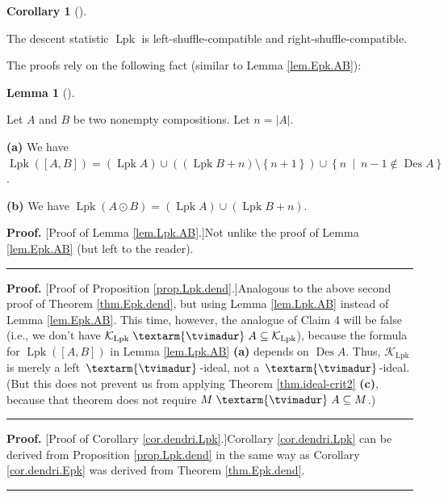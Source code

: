 \documentclass[numbers=enddot,12pt,final,onecolumn,notitlepage]{scrartcl}%
\theoremstyle{definition}
\newtheorem{lem}[theo]{Lemma}
\newenvironment{lemma}[1][]
{\begin{lem}[#1]\begin{leftbar}}
{\end{leftbar}\end{lem}}
\newtheorem{coro}[theo]{Corollary}
\newenvironment{corollary}[1][]
{\begin{coro}[#1]\begin{leftbar}}
{\end{leftbar}\end{coro}}
\newenvironment{proof}[1][Proof]{\noindent\textbf{#1.} }{\ \rule{0.5em}{0.5em}}
\newenvironment{verlong}{}{}
\newcommand{\tvi}{\left. \textarm{\tvimadur} \right.}
\begin{document}
\begin{verlong}
\begin{corollary}
\label{cor.dendri.Lpk}The descent statistic $\operatorname*{Lpk}$ is
left-shuffle-compatible and right-shuffle-compatible.
\end{corollary}

The proofs rely on the following fact (similar to Lemma \ref{lem.Epk.AB}):

\begin{lemma}
\label{lem.Lpk.AB}Let $A$ and $B$ be two nonempty compositions. Let
$n=\left\vert A\right\vert $.

\textbf{(a)} We have $\operatorname*{Lpk}\left(  \left[  A,B\right]  \right)
=\left(  \operatorname*{Lpk}A\right)  \cup\left(  \left(  \operatorname*{Lpk}%
B+n\right)  \setminus\left\{  n+1\right\}  \right)  \cup\left\{
n\ \mid\ n-1\notin\operatorname{Des}A\right\}  $.

\textbf{(b)} We have $\operatorname*{Lpk}\left(  A\odot B\right)  =\left(
\operatorname*{Lpk}A\right)  \cup\left(  \operatorname*{Lpk}B+n\right)  $.
\end{lemma}

\begin{proof}
[Proof of Lemma \ref{lem.Lpk.AB}.]Not unlike the proof of Lemma
\ref{lem.Epk.AB} (but left to the reader).
\end{proof}

\begin{proof}
[Proof of Proposition \ref{prop.Lpk.dend}.]Analogous to the above second proof
of Theorem \ref{thm.Epk.dend}, but using Lemma \ref{lem.Lpk.AB} instead of
Lemma \ref{lem.Epk.AB}. This time, however, the analogue of Claim 4 will be
false (i.e., we don't have $\mathcal{K}_{\operatorname*{Lpk}}\tvi
A\subseteq\mathcal{K}_{\operatorname*{Lpk}}$), because the formula for
$\operatorname*{Lpk}\left(  \left[  A,B\right]  \right)  $ in Lemma
\ref{lem.Lpk.AB} \textbf{(a)} depends on $\operatorname{Des}A$. Thus,
$\mathcal{K}_{\operatorname*{Lpk}}$ is merely a left $\tvi$-ideal, not a
$\tvi$-ideal. (But this does not prevent us from applying Theorem
\ref{thm.ideal-crit2} \textbf{(c)}, because that theorem does not require
$M\tvi A\subseteq M$.)
\end{proof}

\begin{proof}
[Proof of Corollary \ref{cor.dendri.Lpk}.]Corollary \ref{cor.dendri.Lpk} can
be derived from Proposition \ref{prop.Lpk.dend} in the same way as Corollary
\ref{cor.dendri.Epk} was derived from Theorem \ref{thm.Epk.dend}.
\end{proof}


\end{verlong}
\end{document}
